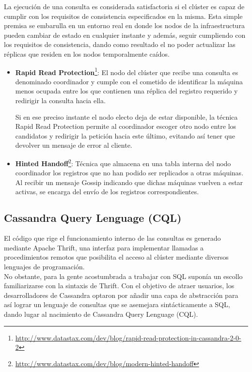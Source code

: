 La ejecución de una consulta es considerada satisfactoria si el clúster es capaz de cumplir con los requisitos de consistencia especificados en la misma. Esta simple premisa se embarulla en un entorno real en donde los nodos de la infraestructura pueden cambiar de estado en cualquier instante y además, seguir cumpliendo con los requisitos de consistencia, dando como resultado el no poder actualizar las réplicas que residen en los nodos temporalmente caídos. 

\begin{itemize}

\item \textbf{Rapid Read Protection}\footnote{\url{http://www.datastax.com/dev/blog/rapid-read-protection-in-cassandra-2-0-2}}: El nodo del clúster que recibe una consulta es denominado coordinador y cumple con el cometido de identificar la máquina menos ocupada entre los que contienen una réplica del registro requerido y redirigir la consulta hacia ella.

Si en ese preciso instante el nodo electo deja de estar disponible, la técnica Rapid Read Protection permite al coordinador escoger otro nodo entre los candidatos y redirigir la petición hacia este último, evitando así tener que devolver un mensaje de error al cliente.

\item \textbf{Hinted Handoff}\footnote{\url{http://www.datastax.com/dev/blog/modern-hinted-handoff}}: Técnica que almacena en una tabla interna del nodo coordinador los registros que no han podido ser replicados a otras máquinas. Al recibir un mensaje Gossip indicando que dichas máquinas vuelven a estar activas, se encarga del envío de los registros correspondientes.

\end{itemize}

\subsection{Cassandra Query Lenguage (CQL)}

El código que rige el funcionamiento interno de las consultas es generado mediante Apache Thrift\cite{slee2007thrift}, una interfaz para implementar llamadas a procedimientos remotos\cite{nelson1981remote} que posibilita el acceso al clúster mediante diversos lenguajes de programación.\\

No obstante, para la gente acostumbrada a trabajar con SQL suponía un escollo familiarizarse con la sintaxis de Thrift. Con el objetivo de atraer usuarios, los desarrolladores de Cassandra optaron por añadir una capa de abstracción para así lograr un lenguaje de consultas que se asemejara sintácticamente a SQL, dando lugar al nacimiento de Cassandra Query Lenguage (CQL).\\

